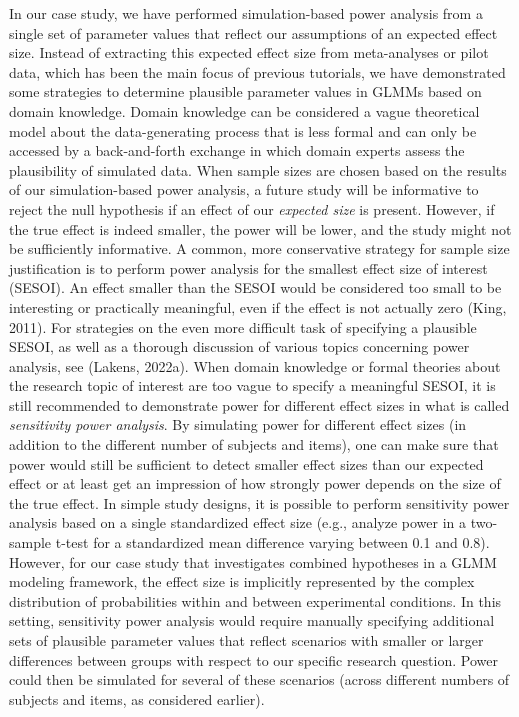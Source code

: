 \documentclass[
  man,floatsintext]{apa6}
\begin{document}
In our case study, we have performed simulation-based power analysis from a single set of parameter values that reflect our assumptions of an expected effect size. Instead of extracting this expected effect size from meta-analyses or pilot data, which has been the main focus of previous tutorials, we have demonstrated some strategies to determine plausible parameter values in GLMMs based on domain knowledge. Domain knowledge can be considered a vague theoretical model about the data-generating process that is less formal and can only be accessed by a back-and-forth exchange in which domain experts assess the plausibility of simulated data. When sample sizes are chosen based on the results of our simulation-based power analysis, a future study will be informative to reject the null hypothesis if an effect of our \emph{expected size} is present. However, if the true effect is indeed smaller, the power will be lower, and the study might not be sufficiently informative. A common, more conservative strategy for sample size justification is to perform power analysis for the smallest effect size of interest (SESOI). An effect smaller than the SESOI would be considered too small to be interesting or practically meaningful, even if the effect is not actually zero (King, 2011). For strategies on the even more difficult task of specifying a plausible SESOI, as well as a thorough discussion of various topics concerning power analysis, see (Lakens, 2022a). When domain knowledge or formal theories about the research topic of interest are too vague to specify a meaningful SESOI, it is still recommended to demonstrate power for different effect sizes in what is called \emph{sensitivity power analysis}. By simulating power for different effect sizes (in addition to the different number of subjects and items), one can make sure that power would still be sufficient to detect smaller effect sizes than our expected effect or at least get an impression of how strongly power depends on the size of the true effect. In simple study designs, it is possible to perform sensitivity power analysis based on a single standardized effect size (e.g., analyze power in a two-sample t-test for a standardized mean difference varying between 0.1 and 0.8). However, for our case study that investigates combined hypotheses in a GLMM modeling framework, the effect size is implicitly represented by the complex distribution of probabilities within and between experimental conditions. In this setting, sensitivity power analysis would require manually specifying additional sets of plausible parameter values that reflect scenarios with smaller or larger differences between groups with respect to our specific research question. Power could then be simulated for several of these scenarios (across different numbers of subjects and items, as considered earlier).
\end{document}
